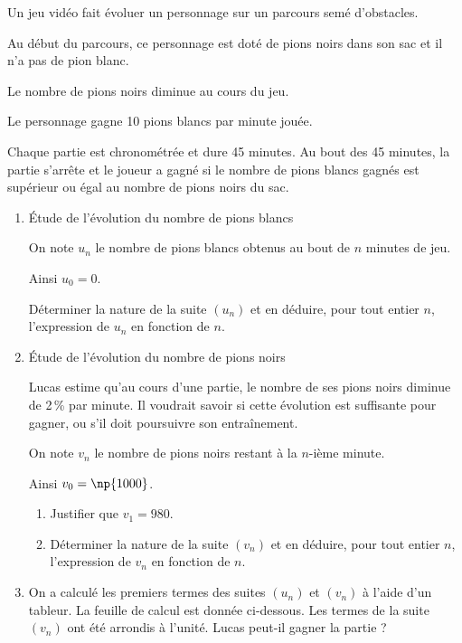 \medskip

Un jeu vidéo fait évoluer un personnage sur un parcours semé d'obstacles.

Au début du parcours, ce personnage est doté de  pions noirs dans son sac et il
n'a pas de pion blanc.

Le nombre de pions noirs diminue au cours du jeu.

Le personnage gagne 10 pions blancs par minute jouée.

Chaque partie est chronométrée et dure 45 minutes. Au bout des 45 minutes, la
partie s'arrête et le joueur a gagné si le nombre de pions blancs gagnés est supérieur
ou égal au nombre de pions noirs du sac.

\medskip

\begin{enumerate}
\item Étude de l'évolution du nombre de pions blancs

On note $u_n$ le nombre de pions blancs obtenus au bout de $n$ minutes de jeu.

Ainsi $u_0 = 0$.

Déterminer la nature de la suite $\left(u_n\right)$ et en déduire, pour tout entier $n$, l'expression
de $u_n$ en fonction de $n$.
\item Étude de l'évolution du nombre de pions noirs

Lucas estime qu'au cours d'une partie, le nombre de ses pions noirs diminue de 2\,\%
par minute. Il voudrait savoir si cette évolution est suffisante pour gagner, ou s'il doit
poursuivre son entraînement.

On note $v_n$ le nombre de pions noirs restant à la $n$-ième minute.

Ainsi $v_0 = \np{1000}$.
\begin{enumerate}
\item Justifier que $v_1 = 980$.
\item Déterminer la nature de la suite $\left(v_n\right)$ et en déduire, pour tout entier $n$,
l'expression de $v_n$ en fonction de $n$.
\end{enumerate}
\item On a calculé les premiers termes des suites $\left(u_n\right)$ et $\left(v_n\right)$ à l'aide d'un tableur. La feuille de calcul est donnée ci-dessous.
Les termes de la suite $\left(v_n\right)$ ont été arrondis à l'unité.
Lucas peut-il gagner la partie ?


\end{enumerate}
